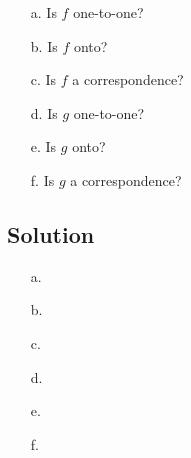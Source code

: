 \documentclass{article}
\begin{document}
\begin{multicols}{2}
\begin{itemize}
\item [a.] Is $f$ one-to-one?
\item [b.] Is $f$ onto?
\item [c.] Is $f$ a correspondence?
\item [d.] Is $g$ one-to-one?
\item [e.] Is $g$ onto?
\item [f.] Is $g$ a correspondence?
\end{itemize}
\end{multicols}


\subsection*{Solution}

\begin{itemize}
\item [a.] 
\item [b.] 
\item [c.] 
\item [d.] 
\item [e.] 
\item [f.] 
\end{itemize}
\end{document}
